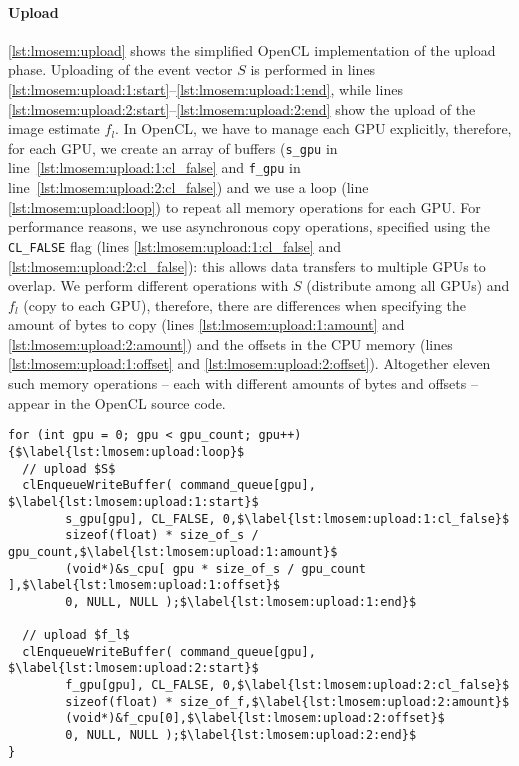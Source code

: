 \paragraph{Upload}
\autoref{lst:lmosem:upload} shows the simplified OpenCL implementation of the upload phase.
Uploading of the event vector $S$ is performed in lines \autoref{lst:lmosem:upload:1:start}--\autoref{lst:lmosem:upload:1:end}, while lines \autoref{lst:lmosem:upload:2:start}--\autoref{lst:lmosem:upload:2:end} show the upload of the image estimate $f_l$.
In OpenCL, we have to manage each GPU explicitly, therefore, for each GPU, we create an array of buffers (\texttt{s\_gpu} in line~\autoref{lst:lmosem:upload:1:cl_false} and \texttt{f\_gpu} in line~\autoref{lst:lmosem:upload:2:cl_false}) and we use a loop (line \autoref{lst:lmosem:upload:loop}) to repeat all memory operations for each GPU.
For performance reasons, we use asynchronous copy operations, specified using the \texttt{CL\_FALSE} flag (lines \autoref{lst:lmosem:upload:1:cl_false} and \autoref{lst:lmosem:upload:2:cl_false}): this allows data transfers to multiple GPUs to overlap.
We perform different operations with $S$ (distribute among all GPUs) and $f_l$ (copy to each GPU), therefore, there are differences when specifying the amount of bytes to copy (lines \autoref{lst:lmosem:upload:1:amount} and \autoref{lst:lmosem:upload:2:amount}) and the offsets in the CPU memory (lines \autoref{lst:lmosem:upload:1:offset} and \autoref{lst:lmosem:upload:2:offset}).
Altogether eleven such memory operations -- each with different amounts of bytes and offsets -- appear in the OpenCL source code.

\begin{lstlisting}[float,
  caption={Implementation of the upload phase in OpenCL (ommitting error checks for brevity)},
  label={lst:lmosem:upload}]
for (int gpu = 0; gpu < gpu_count; gpu++) {$\label{lst:lmosem:upload:loop}$
  // upload $S$
  clEnqueueWriteBuffer( command_queue[gpu], $\label{lst:lmosem:upload:1:start}$
        s_gpu[gpu], CL_FALSE, 0,$\label{lst:lmosem:upload:1:cl_false}$
        sizeof(float) * size_of_s / gpu_count,$\label{lst:lmosem:upload:1:amount}$
        (void*)&s_cpu[ gpu * size_of_s / gpu_count ],$\label{lst:lmosem:upload:1:offset}$
        0, NULL, NULL );$\label{lst:lmosem:upload:1:end}$

  // upload $f_l$
  clEnqueueWriteBuffer( command_queue[gpu], $\label{lst:lmosem:upload:2:start}$
        f_gpu[gpu], CL_FALSE, 0,$\label{lst:lmosem:upload:2:cl_false}$
        sizeof(float) * size_of_f,$\label{lst:lmosem:upload:2:amount}$
        (void*)&f_cpu[0],$\label{lst:lmosem:upload:2:offset}$
        0, NULL, NULL );$\label{lst:lmosem:upload:2:end}$
}
\end{lstlisting}


